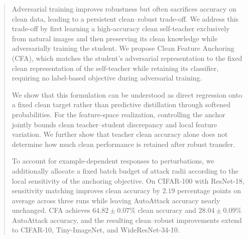 \begin{abstract}

Adversarial training improves robustness but often sacrifices accuracy on
clean data, leading to a persistent clean--robust trade-off.
We address this trade-off by first learning a high-accuracy clean
self-teacher exclusively from natural images and then preserving its clean
knowledge while adversarially training the student.
We propose Clean Feature Anchoring (CFA), which matches the student's
adversarial representation to the fixed clean representation of the
self-teacher while retaining its classifier, requiring no label-based
objective during adversarial training.

We show that this formulation can be understood as direct regression onto a
fixed clean target rather than predictive distillation through softened
probabilities.
For the feature-space realization, controlling the anchor jointly bounds
clean teacher--student discrepancy and local feature variation.
We further show that teacher clean accuracy alone does not determine how much
clean performance is retained after robust transfer.

To account for example-dependent responses to perturbations, we additionally
allocate a fixed batch budget of attack radii according to the local
sensitivity of the anchoring objective.
On CIFAR-100 with ResNet-18, sensitivity matching improves clean accuracy by
\(2.19\) percentage points on average across three runs while leaving
AutoAttack accuracy nearly unchanged.
CFA achieves \(64.82\mathbin{\pm}0.07\%\) clean accuracy and
\(28.04\mathbin{\pm}0.09\%\) AutoAttack accuracy, and the resulting
clean--robust improvements extend to CIFAR-10, Tiny-ImageNet, and
WideResNet-34-10.

\end{abstract}